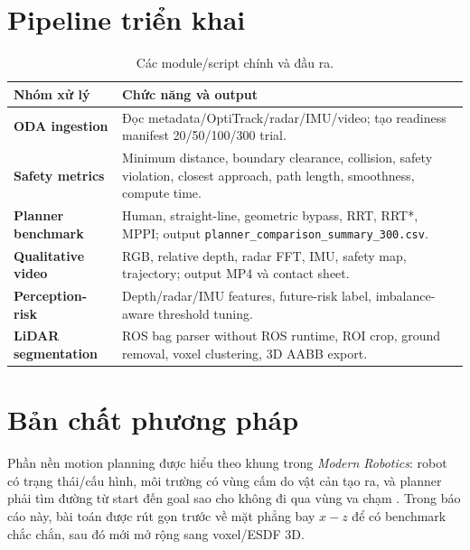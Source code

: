 \documentclass[10pt,a4paper]{article}
\newcommand{\code}[1]{\texttt{#1}}
\begin{document}
\section{Pipeline triển khai}

\begin{table}[H]
\centering
\small
\caption{Các module/script chính và đầu ra.}
\begin{tabularx}{0.98\linewidth}{>{\bfseries}p{4.0cm} X}
\toprule
Nhóm xử lý & Chức năng và output \\
\midrule
ODA ingestion & Đọc metadata/OptiTrack/radar/IMU/video; tạo readiness manifest 20/50/100/300 trial. \\
Safety metrics & Minimum distance, boundary clearance, collision, safety violation, closest approach, path length, smoothness, compute time. \\
Planner benchmark & Human, straight-line, geometric bypass, RRT, RRT*, MPPI; output \code{planner\_comparison\_summary\_300.csv}. \\
Qualitative video & RGB, relative depth, radar FFT, IMU, safety map, trajectory; output MP4 và contact sheet. \\
Perception-risk & Depth/radar/IMU features, future-risk label, imbalance-aware threshold tuning. \\
LiDAR segmentation & ROS bag parser without ROS runtime, ROI crop, ground removal, voxel clustering, 3D AABB export. \\
\bottomrule
\end{tabularx}
\end{table}

\clearpage

\section{Bản chất phương pháp}

Phần nền motion planning được hiểu theo khung trong \textit{Modern Robotics}: robot có trạng thái/cấu hình, môi trường có vùng cấm do vật cản tạo ra, và planner phải tìm đường từ start đến goal sao cho không đi qua vùng va chạm \cite{modernRobotics}. Trong báo cáo này, bài toán được rút gọn trước về mặt phẳng bay \(x-z\) để có benchmark chắc chắn, sau đó mới mở rộng sang voxel/ESDF 3D.
\end{document}
